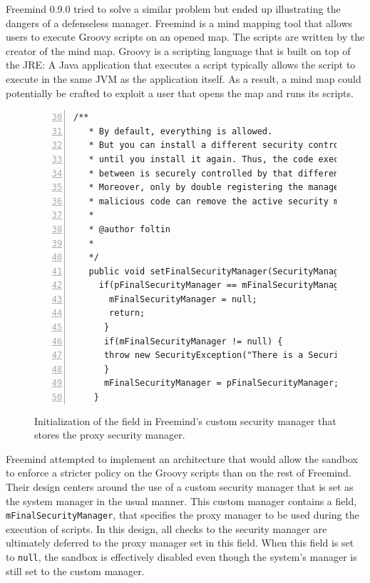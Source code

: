 \documentclass{sig-alternate}
\begin{document}
Freemind 0.9.0 tried to solve a similar problem but ended up illustrating
the dangers of a defenseless manager. Freemind is a mind mapping tool
that allows users to execute Groovy scripts on an opened map. The
scripts are written by the creator of the mind map. Groovy is a scripting
language that is built on top of the JRE: A Java application that
executes a script typically allows the script to execute in the same
JVM as the application itself. As a result, a mind map could potentially
be crafted to exploit a user that opens the map and runs its scripts.

\begin{figure}
\begin{lstlisting}[numbers=left,basicstyle={\scriptsize},breaklines=true,firstnumber=30,xrightmargin={0.1cm},numbersep={-10pt}]
  /**  
   * By default, everything is allowed.  
   * But you can install a different security controller once,  
   * until you install it again. Thus, the code executed in   
   * between is securely controlled by that different security manager.  
   * Moreover, only by double registering the manager is removed. So, no   
   * malicious code can remove the active security manager.  
   *   
   * @author foltin  
   *  
   */
   public void setFinalSecurityManager(SecurityManager pFinalSecurityManager) {
	 if(pFinalSecurityManager == mFinalSecurityManager){
       mFinalSecurityManager = null;
	   return;
      } 		
      if(mFinalSecurityManager != null) {
      throw new SecurityException("There is a SecurityManager installed already."); 		
      } 		
      mFinalSecurityManager = pFinalSecurityManager;
    }	
\end{lstlisting}


\caption{Initialization of the field in Freemind's custom security manager
that stores the proxy security manager.}
\label{fig:Freemind-Security-Manager}
\end{figure}

Freemind attempted to implement an architecture that would allow the
sandbox to enforce a stricter policy on the Groovy scripts than on
the rest of Freemind. Their design centers around the use of a custom
security manager that is set as the system manager in the usual manner.
This custom manager contains a field, \texttt{mFinalSecurityManager},
that specifies the proxy manager to be used during the execution of
scripts. In this design, all checks to the security manager are ultimately
deferred to the proxy manager set in this field. When
this field is set to \texttt{null}, the sandbox is effectively disabled
even though the system's manager is still set to the custom manager.
\end{document}
